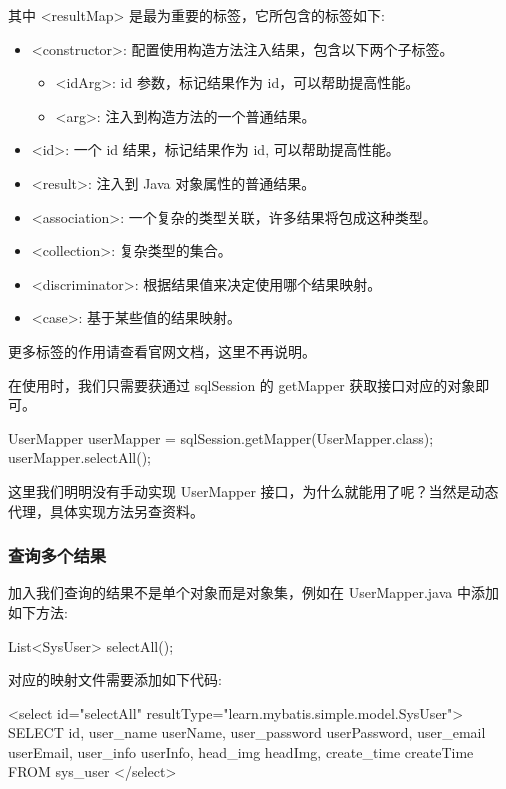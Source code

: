 其中 <resultMap> 是最为重要的标签，它所包含的标签如下:
\begin{itemize}
    \item <constructor>: 配置使用构造方法注入结果，包含以下两个子标签。
    \begin{itemize}
        \item <idArg>: id 参数，标记结果作为 id，可以帮助提高性能。
        \item <arg>: 注入到构造方法的一个普通结果。
    \end{itemize}
    \item <id>: 一个 id 结果，标记结果作为 id, 可以帮助提高性能。
    \item <result>: 注入到 Java 对象属性的普通结果。
    \item <association>: 一个复杂的类型关联，许多结果将包成这种类型。
    \item <collection>: 复杂类型的集合。
    \item <discriminator>: 根据结果值来决定使用哪个结果映射。
    \item <case>: 基于某些值的结果映射。
\end{itemize}

更多标签的作用请查看官网文档，这里不再说明。

在使用时，我们只需要获通过 sqlSession 的 getMapper 获取接口对应的对象即可。

\begin{Java}
UserMapper userMapper = sqlSession.getMapper(UserMapper.class);
userMapper.selectAll();
\end{Java}

这里我们明明没有手动实现 UserMapper 接口，为什么就能用了呢？当然是动态代理，具体实现方法另查资料。

\subsubsection{查询多个结果}

加入我们查询的结果不是单个对象而是对象集，例如在 UserMapper.java 中添加如下方法:

\begin{Java}
List<SysUser> selectAll();
\end{Java}

对应的映射文件需要添加如下代码:

\begin{xml}
<select id="selectAll" resultType="learn.mybatis.simple.model.SysUser">
    SELECT id,
           user_name     userName,
           user_password userPassword,
           user_email    userEmail,
           user_info     userInfo,
           head_img      headImg,
           create_time   createTime
    FROM sys_user
</select>
\end{xml}

